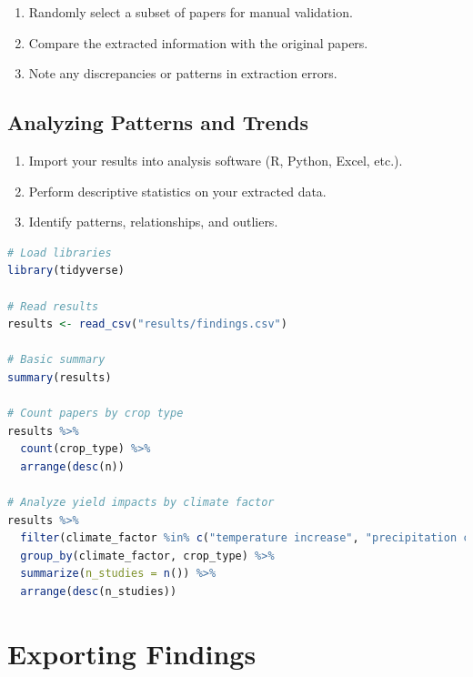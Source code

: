 \begin{enumerate}
    \item Randomly select a subset of papers for manual validation.
    \item Compare the extracted information with the original papers.

    \item Note any discrepancies or patterns in extraction errors.
\end{enumerate}

\subsection{Analyzing Patterns and Trends}

\begin{enumerate}
    \item Import your results into analysis software (R, Python, Excel, etc.).
    \item Perform descriptive statistics on your extracted data.
    \item Identify patterns, relationships, and outliers.
\end{enumerate}

\begin{commandbox}
\begin{lstlisting}[language=R]
# Load libraries
library(tidyverse)

# Read results
results <- read_csv("results/findings.csv")

# Basic summary
summary(results)

# Count papers by crop type
results %>%
  count(crop_type) %>%
  arrange(desc(n))

# Analyze yield impacts by climate factor
results %>%
  filter(climate_factor %in% c("temperature increase", "precipitation change")) %>%
  group_by(climate_factor, crop_type) %>%
  summarize(n_studies = n()) %>%
  arrange(desc(n_studies))
\end{lstlisting}
\end{commandbox}


\section{Exporting Findings}

